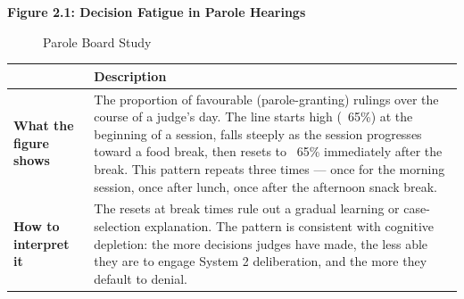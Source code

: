 \documentclass[12pt, letterpaper]{article}
\begin{document}
\newpage
\textbf{Figure 2.1: Decision Fatigue in Parole Hearings}

\begin{figure}[h!]
\centering


\caption{Parole Board Study}

\end{figure}

\begin{table}[H]
\centering
\small
\begin{tabularx}{\linewidth}{lY}
\toprule
 & Description \\
\midrule
\textbf{What the figure shows} & The proportion of favourable (parole-granting) rulings over the course of a judge's day. The line starts high (~65\%) at the beginning of a session, falls steeply as the session progresses toward a food break, then resets to ~65\% immediately after the break. This pattern repeats three times --- once for the morning session, once after lunch, once after the afternoon snack break. \\
\textbf{How to interpret it} & The resets at break times rule out a gradual learning or case-selection explanation. The pattern is consistent with cognitive depletion: the more decisions judges have made, the less able they are to engage System 2 deliberation, and the more they default to denial. \\
\bottomrule
\end{tabularx}
\end{table}
\end{document}
